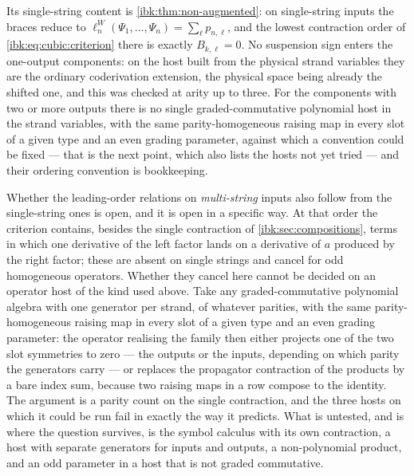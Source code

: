 Its single-string content is \cref{ibk:thm:non-augmented}: on single-string inputs the braces reduce to $\ell^W_n(\Psi_1,\dots,\Psi_n)=\sum_\ell p_{n,\ell}$, and the lowest contraction order of \eqref{ibk:eq:cubic:criterion} there is exactly $B_{k,\ell}=0$. No suspension sign enters the one-output components: on the host built from the physical strand variables they are the ordinary coderivation extension, the physical space being already the shifted one, and this was checked at arity up to three. For the components with two or more outputs there is no single graded-commutative polynomial host in the strand variables, with the same parity-homogeneous raising map in every slot of a given type and an even grading parameter, against which a convention could be fixed --- that is the next point, which also lists the hosts not yet tried --- and their ordering convention is bookkeeping.

Whether the leading-order relations on \emph{multi-string} inputs also follow from the single-string ones is open, and it is open in a specific way. At that order the criterion contains, besides the single contraction of \cref{ibk:sec:compositions}, terms in which one derivative of the left factor lands on a derivative of $a$ produced by the right factor; these are absent on single strings and cancel for odd homogeneous operators. Whether they cancel here cannot be decided on an operator host of the kind used above. Take any graded-commutative polynomial algebra with one generator per strand, of whatever parities, with the same parity-homogeneous raising map in every slot of a given type and an even grading parameter: the operator realising the family then either projects one of the two slot symmetries to zero --- the outputs or the inputs, depending on which parity the generators carry --- or replaces the propagator contraction of the products by a bare index sum, because two raising maps in a row compose to the identity. The argument is a parity count on the single contraction, and the three hosts on which it could be run fail in exactly the way it predicts. What is untested, and is where the question survives, is the symbol calculus with its own contraction, a host with separate generators for inputs and outputs, a non-polynomial product, and an odd parameter in a host that is not graded commutative.

